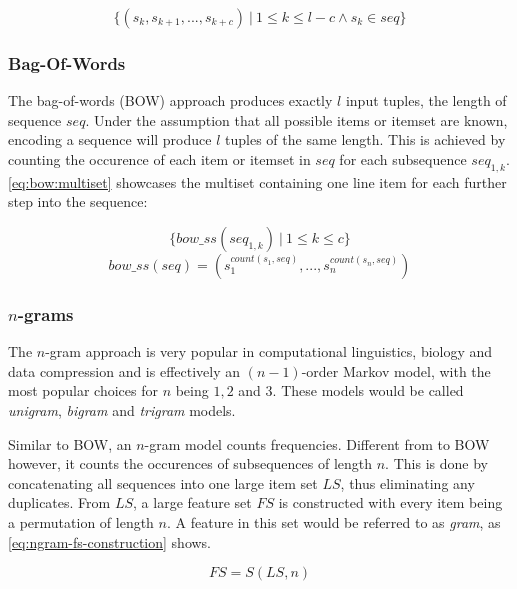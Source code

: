 \begin{equation}
    \label{eq:sliding-window:tuple-set}
    \{ (s_k, s_{k+1}, ..., s_{k+c})\ |\ 1 \leq k \leq l-c \wedge s_k \in seq \}
\end{equation}

\subsubsection{Bag-Of-Words}
The bag-of-words (BOW) approach produces exactly $l$ input tuples, the length of sequence $seq$. Under the assumption that all possible items or itemset are known, encoding a sequence will produce $l$ tuples of the same length. This is achieved by counting the occurence of each item or itemset in $seq$ for each subsequence $seq_{1,k}$. \autoref{eq:bow:multiset} showcases the multiset containing one line item for each further step into the sequence:

\begin{equation}
    \label{eq:bow:multiset}
    \{ bow\_ss(seq_{1,k})\ |\ 1 \leq k \leq c \}
\end{equation}
\begin{equation}
    bow\_ss(seq) = ( s_1^{count(s_1,seq)}, ..., s_n^{count(s_n,seq)} )
\end{equation}

\subsubsection{$n$-grams}
The $n$-gram approach is very popular in computational linguistics, biology and data compression and is effectively an $(n-1)$-order Markov model, with the most popular choices for $n$ being $1,2$ and $3$. These models would be called \textit{unigram}, \textit{bigram} and \textit{trigram} models.

Similar to BOW, an $n$-gram model counts frequencies. Different from to BOW however, it counts the occurences of subsequences of length $n$. This is done by concatenating all sequences into one large item set $LS$, thus eliminating any duplicates. From $LS$, a large feature set $FS$ is constructed with every item being a permutation of length $n$. A feature in this set would be referred to as \textit{gram}, as \autoref{eq:ngram-fs-construction} shows.

\begin{equation}\label{eq:ngram-fs-construction}
    FS = S(LS, n)
\end{equation}

